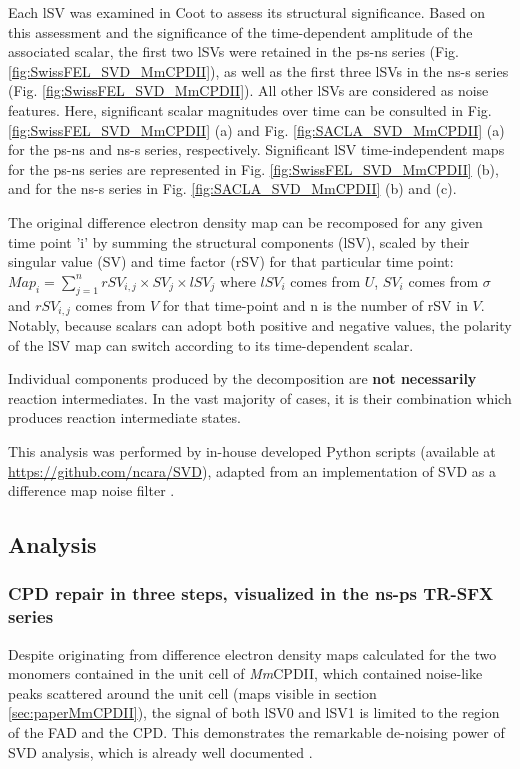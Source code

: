 Each lSV was examined in Coot \parencite{emsleyFeaturesDevelopmentCoot2010} to assess its structural significance. Based on this assessment and the significance of the time-dependent amplitude of the associated scalar, the first two lSVs were retained in the ps-ns series (Fig. \ref{fig:SwissFEL_SVD_MmCPDII}), as well as the first three lSVs in the ns-\textmu s series (Fig. \ref{fig:SwissFEL_SVD_MmCPDII}). All other lSVs are considered as noise features. Here, significant scalar magnitudes over time can be consulted in Fig. \ref{fig:SwissFEL_SVD_MmCPDII} (a) and Fig. \ref{fig:SACLA_SVD_MmCPDII} (a) for the ps-ns and ns-\textmu s series, respectively. Significant lSV time-independent maps for the ps-ns series are represented in Fig. \ref{fig:SwissFEL_SVD_MmCPDII} (b), and for the ns-\textmu s series in Fig. \ref{fig:SACLA_SVD_MmCPDII} (b) and (c). 

The original difference electron density map can be recomposed for any given time point 'i' by summing the structural components (lSV), scaled by their singular value (SV) and time factor (rSV) for that particular time point: \(Map_i=\sum_{j=1}^{n} rSV_{i,j} \times SV_{j} \times lSV_{j}\) where \(lSV_{i}\) comes from \(U\), \(SV_{i}\) comes from \(\sigma\) and \(rSV_{i,j}\) comes from \(V\) for that time-point and n is the number of rSV in \(V\). Notably, because scalars can adopt both positive and negative values, the polarity of the lSV map can switch according to its time-dependent scalar.

Individual components produced by the decomposition are \textbf{not necessarily} reaction intermediates. In the vast majority of cases, it is their combination which produces reaction intermediate states. 

This analysis was performed by in-house developed Python scripts (available at \url{https://github.com/ncara/SVD}), adapted from an implementation of SVD as a difference map noise filter \parencite{dodsUltrafastStructuralChanges2021}.

\subsection{Analysis} \label{sec:SVD_MmCPDII}

\subsubsection{CPD repair in three steps, visualized in the ns-ps TR-SFX series}
Despite originating from difference electron density maps calculated for the two monomers contained in the unit cell of \textit{Mm}CPDII, which contained noise-like peaks scattered around the unit cell (maps visible in section \ref{sec:paperMmCPDII}), the signal of both lSV0 and lSV1 is limited to the region of the FAD and the CPD. This demonstrates the remarkable de-noising power of SVD analysis, which is already well documented \parencite{schmidtApplicationSingularValue2003, dodsUltrafastStructuralChanges2021, vallejosAppraisingProteinConformational2024}. 

